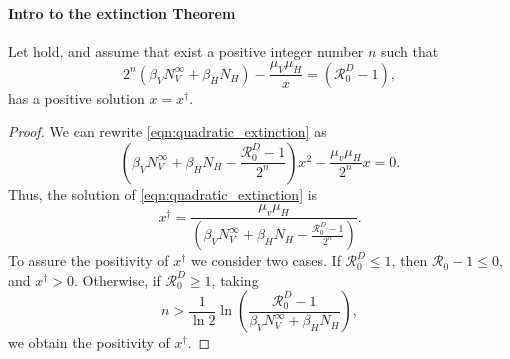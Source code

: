 %
\paragraph{Intro to the extinction Theorem}
\begin{lemma}
    \label{lem:quadratic_equation}
    Let  hold, 
    and assume that exist a positive integer number $n$
    such that 
    \begin{equation}\label{eqn:quadratic_extinction}
        2^n
        \left(
            \beta_V
             N_V^{\infty} +
            \beta_H N_H
        \right) 
        - \frac{\mu_V \mu_H}{x}
        =
        \left(
            \mathcal{R}_0^D -1
        \right),
    \end{equation}
    has a positive solution $x=x^\dagger$. 
\end{lemma}
%
\begin{proof}
    We can rewrite \eqref{eqn:quadratic_extinction} as
    \begin{equation*}
        \left(
             \beta_V
             N_V ^ {\infty} +
            \beta_H N_H            
            -\frac{\mathcal{R}_0 ^ D - 1}{2 ^ n}
        \right) x ^ 2
        - \frac{\mu_v \mu_H}{2 ^ n} x
        = 0.
    \end{equation*}
    Thus, the solution of \eqref{eqn:quadratic_extinction} is
    \begin{equation}
        \label{eqn:quadratic_solution}
        x^{\dagger} = 
            \frac{\mu_v \mu_H}{
                \left(
                     \beta_V
                     N_V ^ {\infty} +
                    \beta_H N_H
                    -\frac{\mathcal{R}_0 ^ D - 1}{2 ^ n}
                \right)
            }.
    \end{equation}
    To assure the positivity of $x^{\dagger}$ we consider two cases.
    If $\mathcal{R}_0 ^ D \leq 1$, 
    then $\mathcal{R}_0 - 1 \leq 0$, and $x^{\dagger} >0$.
    Otherwise, if $\mathcal{R}_0 ^ D \geq 1$,
    taking 
    \begin{equation}
        \label{eqn:n_condition}
        n > \frac{1}{\ln 2} 
            \ln
            \left(
                \displaystyle
                \frac{\mathcal{R}_0 ^ D - 1}{
                    \beta_V
                    N_V ^ {\infty} +
                    \beta_H N_H
                }
            \right),
    \end{equation}
    we obtain the positivity of $x^{\dagger}$.
\end{proof}
